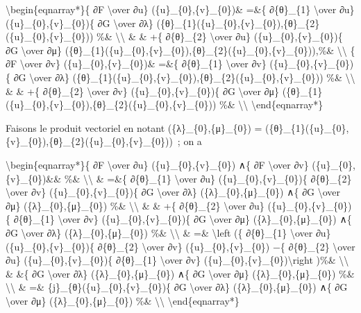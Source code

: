 \documentclass[]{article}
\begin{document}
\textbackslash{}begin\{eqnarray*\}\{ ∂F \textbackslash{}over ∂u\}
(\{u\}\_\{0\},\{v\}\_\{0\})\& =\&\{ ∂\{θ\}\_\{1\} \textbackslash{}over
∂u\} (\{u\}\_\{0\},\{v\}\_\{0\})\{ ∂G \textbackslash{}over ∂λ\}
(\{θ\}\_\{1\}(\{u\}\_\{0\},\{v\}\_\{0\}),\{θ\}\_\{2\}(\{u\}\_\{0\},\{v\}\_\{0\}))
\%\& \textbackslash{}\textbackslash{} \& \& +\{ ∂\{θ\}\_\{2\}
\textbackslash{}over ∂u\} (\{u\}\_\{0\},\{v\}\_\{0\})\{ ∂G
\textbackslash{}over ∂μ\}
(\{θ\}\_\{1\}(\{u\}\_\{0\},\{v\}\_\{0\}),\{θ\}\_\{2\}(\{u\}\_\{0\},\{v\}\_\{0\})),\%\&
\textbackslash{}\textbackslash{} \{ ∂F \textbackslash{}over ∂v\}
(\{u\}\_\{0\},\{v\}\_\{0\})\& =\&\{ ∂\{θ\}\_\{1\} \textbackslash{}over
∂v\} (\{u\}\_\{0\},\{v\}\_\{0\})\{ ∂G \textbackslash{}over ∂λ\}
(\{θ\}\_\{1\}(\{u\}\_\{0\},\{v\}\_\{0\}),\{θ\}\_\{2\}(\{u\}\_\{0\},\{v\}\_\{0\}))
\%\& \textbackslash{}\textbackslash{} \& \& +\{ ∂\{θ\}\_\{2\}
\textbackslash{}over ∂v\} (\{u\}\_\{0\},\{v\}\_\{0\})\{ ∂G
\textbackslash{}over ∂μ\}
(\{θ\}\_\{1\}(\{u\}\_\{0\},\{v\}\_\{0\}),\{θ\}\_\{2\}(\{u\}\_\{0\},\{v\}\_\{0\}))
\%\& \textbackslash{}\textbackslash{} \textbackslash{}end\{eqnarray*\}

Faisons le produit vectoriel en notant (\{λ\}\_\{0\},\{μ\}\_\{0\}) =
(\{θ\}\_\{1\}(\{u\}\_\{0\},\{v\}\_\{0\}),\{θ\}\_\{2\}(\{u\}\_\{0\},\{v\}\_\{0\}))~;
on a

\textbackslash{}begin\{eqnarray*\}\{ ∂F \textbackslash{}over ∂u\}
(\{u\}\_\{0\},\{v\}\_\{0\}) ∧\{ ∂F \textbackslash{}over ∂v\}
(\{u\}\_\{0\},\{v\}\_\{0\})\&\& \%\& \textbackslash{}\textbackslash{} \&
=\&\{ ∂\{θ\}\_\{1\} \textbackslash{}over ∂u\}
(\{u\}\_\{0\},\{v\}\_\{0\})\{ ∂\{θ\}\_\{2\} \textbackslash{}over ∂v\}
(\{u\}\_\{0\},\{v\}\_\{0\})\{ ∂G \textbackslash{}over ∂λ\}
(\{λ\}\_\{0\},\{μ\}\_\{0\}) ∧\{ ∂G \textbackslash{}over ∂μ\}
(\{λ\}\_\{0\},\{μ\}\_\{0\}) \%\& \textbackslash{}\textbackslash{} \& \&
+\{ ∂\{θ\}\_\{2\} \textbackslash{}over ∂u\}
(\{u\}\_\{0\},\{v\}\_\{0\})\{ ∂\{θ\}\_\{1\} \textbackslash{}over ∂v\}
(\{u\}\_\{0\},\{v\}\_\{0\})\{ ∂G \textbackslash{}over ∂μ\}
(\{λ\}\_\{0\},\{μ\}\_\{0\}) ∧\{ ∂G \textbackslash{}over ∂λ\}
(\{λ\}\_\{0\},\{μ\}\_\{0\}) \%\& \textbackslash{}\textbackslash{} \& =\&
\textbackslash{}left (\{ ∂\{θ\}\_\{1\} \textbackslash{}over ∂u\}
(\{u\}\_\{0\},\{v\}\_\{0\})\{ ∂\{θ\}\_\{2\} \textbackslash{}over ∂v\}
(\{u\}\_\{0\},\{v\}\_\{0\}) −\{ ∂\{θ\}\_\{2\} \textbackslash{}over ∂u\}
(\{u\}\_\{0\},\{v\}\_\{0\})\{ ∂\{θ\}\_\{1\} \textbackslash{}over ∂v\}
(\{u\}\_\{0\},\{v\}\_\{0\})\textbackslash{}right )\%\&
\textbackslash{}\textbackslash{} \& \&\{ ∂G \textbackslash{}over ∂λ\}
(\{λ\}\_\{0\},\{μ\}\_\{0\}) ∧\{ ∂G \textbackslash{}over ∂μ\}
(\{λ\}\_\{0\},\{μ\}\_\{0\}) \%\& \textbackslash{}\textbackslash{} \& =\&
\{j\}\_\{θ\}(\{u\}\_\{0\},\{v\}\_\{0\})\{ ∂G \textbackslash{}over ∂λ\}
(\{λ\}\_\{0\},\{μ\}\_\{0\}) ∧\{ ∂G \textbackslash{}over ∂μ\}
(\{λ\}\_\{0\},\{μ\}\_\{0\}) \%\& \textbackslash{}\textbackslash{}
\textbackslash{}end\{eqnarray*\}
\end{document}
